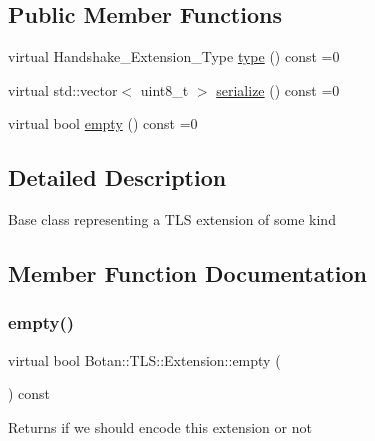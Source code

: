 \subsection*{Public Member Functions}
\begin{DoxyCompactItemize}
\item 
virtual Handshake\+\_\+\+Extension\+\_\+\+Type \hyperlink{class_botan_1_1_t_l_s_1_1_extension_ac8819b312ce604453225e7b4f7c373ec}{type} () const =0
\item 
virtual std\+::vector$<$ uint8\+\_\+t $>$ \hyperlink{class_botan_1_1_t_l_s_1_1_extension_a56788726ad2526db54e5a26039cb69db}{serialize} () const =0
\item 
virtual bool \hyperlink{class_botan_1_1_t_l_s_1_1_extension_aa850b9be2322f94e7c65e583cd51acc5}{empty} () const =0
\end{DoxyCompactItemize}


\subsection{Detailed Description}
Base class representing a T\+LS extension of some kind 

\subsection{Member Function Documentation}
\mbox{\label{class_botan_1_1_t_l_s_1_1_extension_aa850b9be2322f94e7c65e583cd51acc5}} 
\subsubsection{\texorpdfstring{empty()}{empty()}}
{\footnotesize\ttfamily virtual bool Botan\+::\+T\+L\+S\+::\+Extension\+::empty (\begin{DoxyParamCaption}{ }\end{DoxyParamCaption}) const\hspace{0.3cm}{\ttfamily [pure virtual]}}

\begin{DoxyReturn}{Returns}
if we should encode this extension or not 
\end{DoxyReturn}


